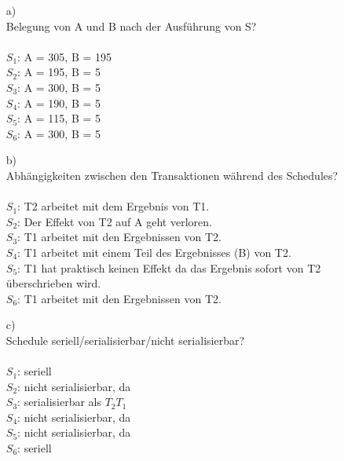 \documentclass[a4paper,11pt,fleqn]{scrartcl}
\begin{document}
\begin{enumerate}
			\begin{enumerate}
				\item[a)]\quad \\
				Belegung von A und B nach der Ausführung von S?\\
				\\
				$S_1$: A = 305, B = 195\\
				$S_2$: A = 195, B = 5\\
				$S_3$: A = 300, B = 5\\
				$S_4$: A = 190, B = 5\\
				$S_5$: A = 115, B = 5\\
				$S_6$: A = 300, B = 5

				\item[b)]\quad \\
				Abhängigkeiten zwischen den Transaktionen während des Schedules?\\
				\\
				$S_1$: T2 arbeitet mit dem Ergebnis von T1. \\
				$S_2$: Der Effekt von T2 auf A geht verloren. \\
				$S_3$: T1 arbeitet mit den Ergebnissen von T2. \\
				$S_4$: T1 arbeitet mit einem Teil des Ergebnisses (B) von T2. \\
				$S_5$: T1 hat praktisch keinen Effekt da das Ergebnis sofort von T2 überschrieben wird. \\
				$S_6$: T1 arbeitet mit den Ergebnissen von T2. \\

				\item[c)]\quad \\
				Schedule seriell/serialisierbar/nicht serialisierbar?\\
				\\
				$S_1$: seriell\\
				$S_2$: nicht serialisierbar, da \\
				$S_3$: serialisierbar als $T_2 T_1$\\
				$S_4$: nicht serialisierbar, da \\
				$S_5$: nicht serialisierbar, da \\
				$S_6$: seriell
			\end{enumerate}


\end{enumerate}
\end{document}
